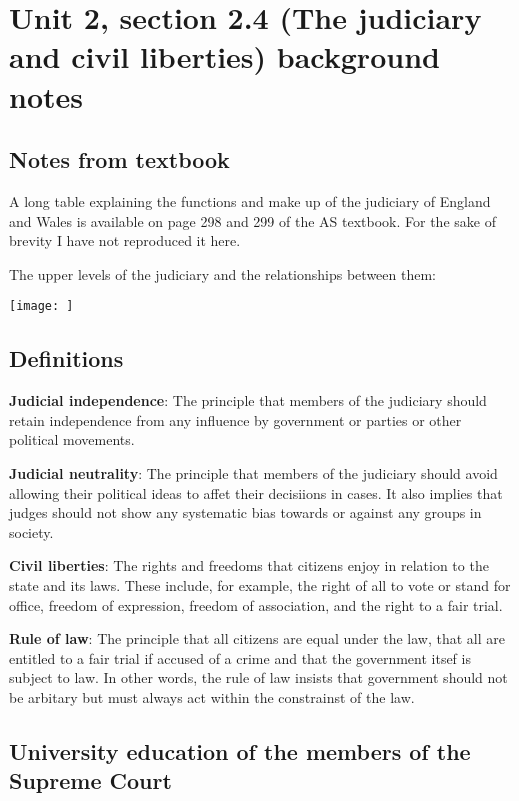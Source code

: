 \documentclass[11pt]{article}
\begin{document}
\section*{Unit 2, section 2.4 (The judiciary and civil liberties) background
notes}

\subsection*{Notes from textbook}

A long table explaining the functions and make up of the judiciary of
England and Wales is available on page 298 and 299 of the AS textbook.  For
the sake of brevity I have not reproduced it here.

The upper levels of the judiciary and the relationships between them:

\texttt{[image: ]}



\subsection*{Definitions}

\textbf{Judicial independence}: The principle that members of the judiciary
should retain independence from any influence by government or parties or
other political movements.

\textbf{Judicial neutrality}: The principle that members of the judiciary
should avoid allowing their political ideas to affet their decisiions in
cases.  It also implies that judges should not show any systematic bias
towards or against any groups in society.

\textbf{Civil liberties}: The rights and freedoms that citizens enjoy in
relation to the state and its laws.  These include, for example, the right
of all to vote or stand for office, freedom of expression, freedom of
association, and the right to a fair trial.

\textbf{Rule of law}: The principle that all citizens are equal under the
law, that all are entitled to a fair trial if accused of a crime and that
the government itsef is subject to law.  In other words, the rule of law
insists that government should not be arbitary but must always act within
the constrainst of the law.

\subsection*{University education of the members of the Supreme Court}
\end{document}
